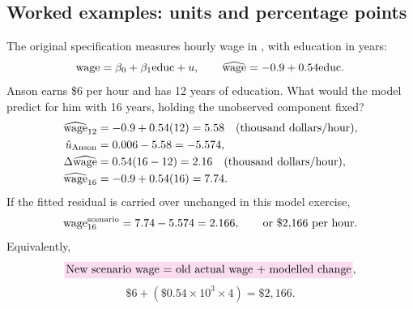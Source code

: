 \subsection{Worked examples: units and percentage points}
\begin{example}\label{ex:wage-units}
The original specification measures hourly wage in , with education in years:
\[\mathrm{wage}=\beta_0+\beta_1\mathrm{educ}+u,\qquad
\widehat{\mathrm{wage}}=-0.9+0.54\mathrm{educ}.\]
Anson earns \$6 per hour and has 12 years of education. What would the model predict for him with 16 years, holding the unobserved component fixed?
\begin{align*}
\widehat{\mathrm{wage}}_{12}&=-0.9+0.54(12)=5.58\quad\text{(thousand dollars/hour)},\\
\hat u_{\rm Anson}&=0.006-5.58=-5.574,\\
\Delta\widehat{\mathrm{wage}}&=0.54(16-12)=2.16\quad\text{(thousand dollars/hour)},\\
\widehat{\mathrm{wage}}_{16}&=-0.9+0.54(16)=7.74.
\end{align*}
If the fitted residual is carried over unchanged in this model exercise,
\[\mathrm{wage}_{16}^{\rm scenario}=7.74-5.574=2.166,
\qquad\text{or }\$2{,}166\text{ per hour}.\]
Equivalently,
\[\hp{New scenario wage = old actual wage + modelled change},\]
\[\$6+(\$0.54\times10^3\times4)=\$2{,}166.\]
\end{example}

